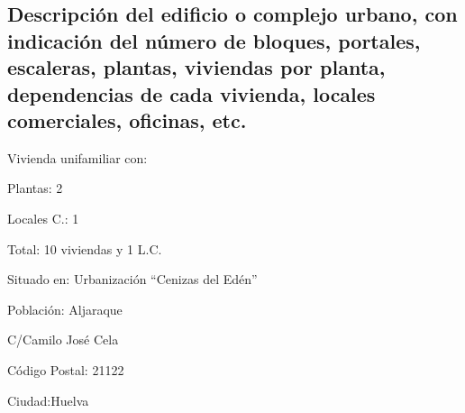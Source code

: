 \subsection{Descripción del edificio o complejo urbano, con indicación del número de bloques, portales, escaleras, plantas, viviendas por planta, dependencias de cada vivienda, locales comerciales, oficinas, etc.}
Vivienda unifamiliar con:


Plantas: 2


Locales C.: 1


Total: 10 viviendas y 1 L.C.


	Situado en: Urbanización ``Cenizas del Edén''
	
	Población: Aljaraque
	
	C/Camilo José Cela
	
	Código Postal: 21122 
	
	Ciudad:Huelva
	
